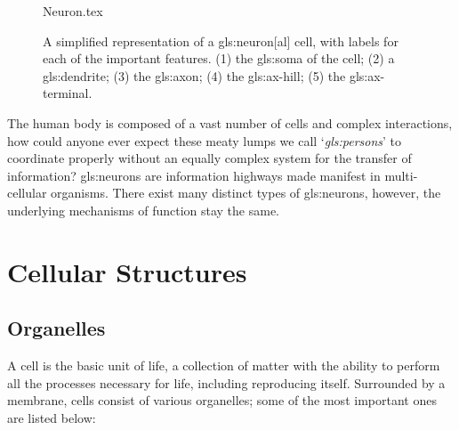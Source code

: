 \documentclass[class={myRUCProject}, crop=false]{standalone}
\begin{document}
\begin{figure}[H]
  \centering
  {Neuron.tex}
  \caption{A simplified representation of a \gls{gls:neuron}[al] cell, with labels for each of the important features. (1) the \gls{gls:soma} of the cell; (2) a \gls{gls:dendrite}; (3) the \gls{gls:axon}; (4) the \gls{gls:ax-hill}; (5) the \gls{gls:ax-terminal}.}\label{fig:Neuron}
\end{figure}

The human body is composed of a vast number of cells and complex interactions, how could anyone ever expect these meaty lumps we call `\textit{\glspl{gls:person}}' to coordinate properly without an equally complex system for the transfer of information? 
\Glspl{gls:neuron} are information highways made manifest in multi-cellular organisms. 
There exist many distinct types of \glspl{gls:neuron}, however, the underlying mechanisms of function stay the same.

\section{Cellular Structures}
\subsection{Organelles}

A cell is the basic unit of life, a collection of matter with the ability to perform all the processes necessary for life, including reproducing itself. Surrounded by a membrane, cells consist of various organelles; some of the most important ones are listed below:
\end{document}

